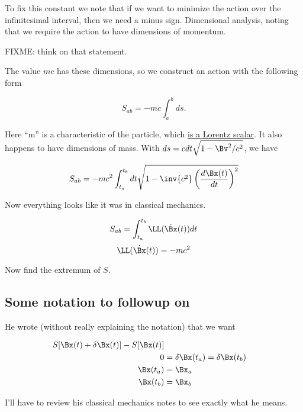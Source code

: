 To fix this constant we note that if we want to minimize the action over the infinitesimal interval, then we need a minus sign.  Dimensional analysis, noting that we require the action to have dimensions of momentum.  

FIXME: think on that statement.

The value $mc$ has these dimensions, so we construct an action with the following form

\begin{equation}\label{eqn:relativisticElectrodynamicsL7:190}
S_{ab} = - m c\int_a^b ds.
\end{equation}

Here ``m'' is a characteristic of the particle, which \underline{is a Lorentz scalar}.  It also happens to have dimensions of mass.  With $ds = c dt \sqrt{1 - \Bv^2/c^2}$, we have

\begin{equation}\label{eqn:relativisticElectrodynamicsL7:200}
S_{ab} = - m c^2 \int_{t_a}^{t_b} dt \sqrt{ 1 - \inv{c^2} \left( \frac{d \Bx(t) }{dt} \right)^2 }
\end{equation}

Now everything looks like it was in classical mechanics.

\begin{equation}\label{eqn:relativisticElectrodynamicsL7:210}
S_{ab} = \int_{t_a}^{t_b} \LL(\dot{\Bx}(t)) dt
\end{equation}
\begin{equation}\label{eqn:relativisticElectrodynamicsL7:220}
\LL(\dot{\Bx}(t)) = -m c^2 
\end{equation}

Now find the extremum of $S$.

\subsection{Some notation to followup on}
He wrote (without really explaining the notation) that we want

\begin{align}\label{eqn:relativisticElectrodynamicsL7:230}
S[\Bx(t) + \delta \Bx(t)] - S[ \Bx(t) ] \\
0 &= \delta \Bx(t_a) = \delta \Bx(t_b) \\
\Bx(t_a) &= \Bx_a \\
\Bx(t_b) &= \Bx_b
\end{align}

I'll have to review his classical mechanics notes to see exactly what he means.

